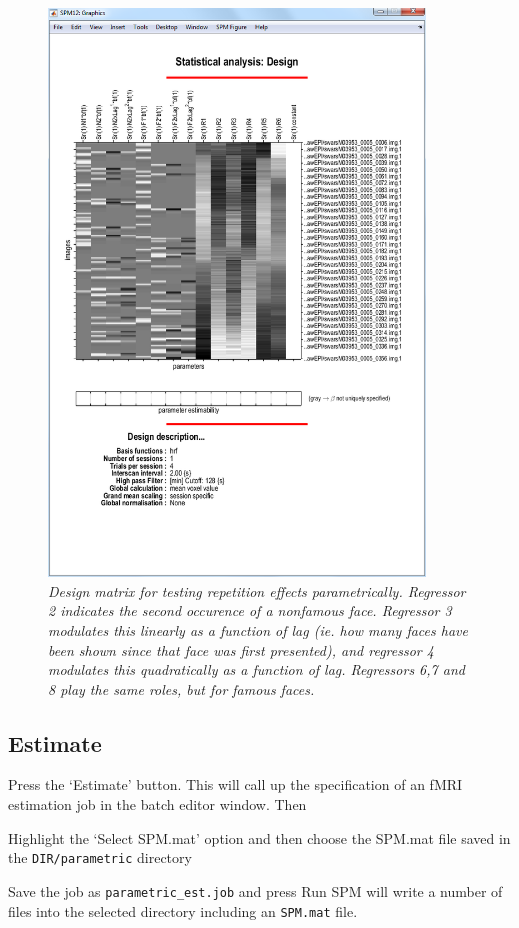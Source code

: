 \begin{figure}
\begin{center}
\includegraphics[width=100mm]{faces/par_design}
\caption{\em Design matrix for testing repetition effects parametrically. Regressor 2 indicates the second occurence of a nonfamous face. Regressor 3 modulates this linearly as a function of lag (ie. how many faces have been shown since that face was first presented), and regressor 4 modulates this quadratically as a function of lag. Regressors 6,7 and 8 play the same roles, but for famous faces. \label{par_design} }
\end{center}
\end{figure}

\subsection{Estimate}

Press the `Estimate' button. This will call up the specification of an fMRI estimation job in the batch editor window. Then
\bi
\item{Highlight the `Select SPM.mat' option and then choose the SPM.mat
file saved in the \verb!DIR/parametric! directory}
\item{Save the job as \verb!parametric_est.job! and press Run}
\ei
SPM will write a number of files into the selected directory including 
an \verb!SPM.mat! file.


